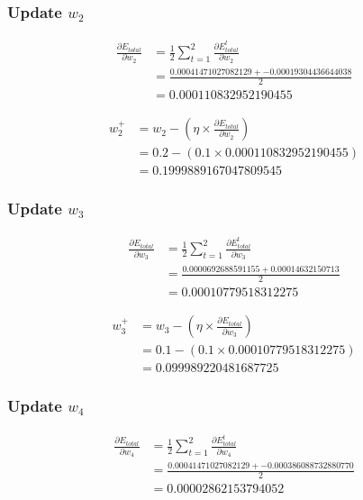 \documentclass{article}
\begin{document}
\subsubsection{Update $w_2$}
\begin{align*}
    \frac{\partial E_{total}}{\partial w_2} & =
        \frac{1}{2}
            \sum_{t=1}^{2}{
                \frac{\partial E_{total}^{t}}{\partial w_2}} \\
    & = \frac{0.00041471027082129 + -0.00019304436644038}{2} \\
    & = 0.000110832952190455
\end{align*}

\begin{align*}
    w_{2}^{+} &= w_2 - (\eta \times \frac{\partial E_{total}}{\partial w_2}) \\
    & = 0.2 - (0.1 \times 0.000110832952190455) \\
    & = 0.1999889167047809545 
\end{align*}
\subsubsection{Update $w_3$}
\begin{align*}
    \frac{\partial E_{total}}{\partial w_3} & =
        \frac{1}{2}
            \sum_{t=1}^{2}{
                \frac{\partial E_{total}^{t}}{\partial w_3}} \\
    & = \frac{0.0000692688591155 + 0.00014632150713}{2} \\
    & = 0.00010779518312275
\end{align*}

\begin{align*}
    w_{3}^{+} &= w_3 - (\eta \times \frac{\partial E_{total}}{\partial w_3}) \\
    & = 0.1 - (0.1 \times 0.00010779518312275) \\
    & = 0.099989220481687725
\end{align*}
\subsubsection{Update $w_4$}
\begin{align*}
    \frac{\partial E_{total}}{\partial w_4} & =
        \frac{1}{2}
            \sum_{t=1}^{2}{
                \frac{\partial E_{total}^{t}}{\partial w_4}} \\
    & = \frac{0.00041471027082129 + -0.000386088732880770}{2} \\
    & = 0.00002862153794052
\end{align*}
\end{document}
